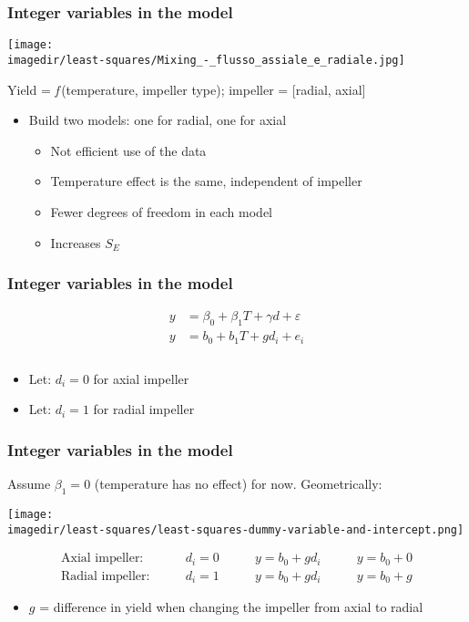 \begin{frame}\frametitle{Integer variables in the model}
	\begin{center}
		\texttt{[image: \\imagedir/least-squares/Mixing\_-\_flusso\_assiale\_e\_radiale.jpg]}
	\end{center}
	\vspace{-16pt}

	\vspace{12pt}
	Yield = \emph{f}\,(temperature, impeller type); impeller = [radial, axial]
	\begin{itemize}
		\item	Build two models: one for radial, one for axial
		\begin{itemize}
			\item	Not efficient use of the data
			\item	Temperature effect is the same, independent of impeller
			\item	Fewer degrees of freedom in each model
			\item	Increases $S_E$
		\end{itemize}
	\end{itemize}
\end{frame}

\begin{frame}\frametitle{Integer variables in the model}
	$$
	\begin{array}{lr}
		y &= \beta_0 + \beta_1 T + \gamma d + \varepsilon \\
		y &= b_0 + b_1 T + g d_i + e_i \\
		\\
	\end{array}
	$$
	\begin{itemize}
		\item	Let: $d_i = 0$ for axial impeller
		\item	Let: $d_i = 1$ for radial impeller
	\end{itemize}
\end{frame}

\begin{frame}\frametitle{Integer variables in the model}

	Assume $\beta_1 = 0$ (temperature has no effect) for now. Geometrically:
	\begin{center}
		\texttt{[image: \\imagedir/least-squares/least-squares-dummy-variable-and-intercept.png]}
	\end{center}
	$$
	\begin{array}{llll}
		\text{Axial impeller:} \qquad & d_i=0 &\qquad y = b_0 + gd_i &\qquad y = b_0 + 0 \\
		\text{Radial impeller:} \qquad & d_i=1 &\qquad y = b_0 + gd_i & \qquad y = b_0 + g
	\end{array}
	$$
	\begin{itemize}
		\item	$g$ = difference in yield when changing the impeller from axial to radial
	\end{itemize}
\end{frame}

